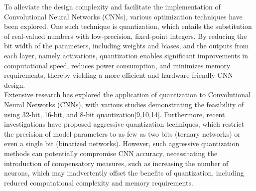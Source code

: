 To alleviate the design complexity and facilitate the implementation of Convolutional Neural Networks (CNNs), various optimization techniques have been explored. One such technique is quantization, which entails the substitution of real-valued numbers with low-precision, fixed-point integers. By reducing the bit width of the parameters, including weights and biases, and the outputs from each layer, namely activations, quantization enables significant improvements in computational speed, reduces power consumption, and minimizes memory requirements, thereby yielding a more efficient and hardware-friendly CNN design.\\
Extensive research has explored the application of quantization to Convolutional Neural Networks (CNNs), with various studies demonstrating the feasibility of using 32-bit, 16-bit, and 8-bit quantization[9,10,14]. Furthermore, recent investigations have proposed aggressive quantization techniques, which restrict the precision of model parameters to as few as two bits (ternary networks) or even a single bit (binarized networks). However, such aggressive quantization methods can potentially compromise CNN accuracy, necessitating the introduction of compensatory measures, such as increasing the number of neurons, which may inadvertently offset the benefits of quantization, including reduced computational complexity and memory requirements.









